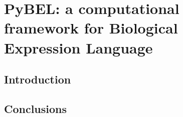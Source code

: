 \chapter{PyBEL: a computational framework for Biological Expression Language}\label{chap:pybel}

\section*{Introduction}



\section*{Conclusions}
